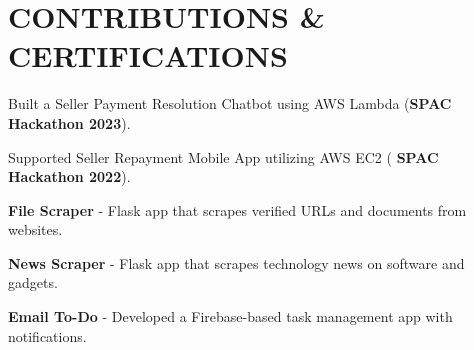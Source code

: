 \section{CONTRIBUTIONS \& CERTIFICATIONS}
\begin{onecolentry}
    \begin{highlights}
        \item Built a Seller Payment Resolution Chatbot using AWS Lambda (\textbf{SPAC Hackathon 2023}).
        \item Supported Seller Repayment Mobile App utilizing AWS EC2 (
        \textbf{SPAC Hackathon 2022}).
        \item \textbf{File Scraper} - Flask app that scrapes verified URLs and documents from websites. {}
        \item \textbf{News Scraper} - Flask app that scrapes technology news on software and gadgets. {}
        \item \textbf{Email To-Do} - Developed a Firebase-based task management app with notifications.
        {}
    \end{highlights}
\end{onecolentry}